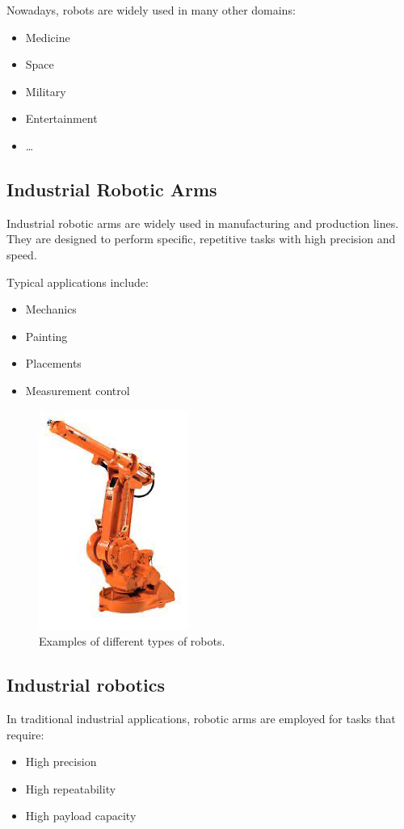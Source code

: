 Nowadays, robots are widely used in many other domains:
\begin{itemize}
  \item Medicine
  \item Space
  \item Military
  \item Entertainment
  \item \dots
\end{itemize}

\hfill

\subsection{Industrial Robotic Arms}

Industrial robotic arms are widely used in manufacturing and production lines. They are designed to perform specific, repetitive tasks with high precision and speed.

Typical applications include:
\begin{itemize}
  \item Mechanics
  \item Painting
  \item Placements
  \item Measurement control
\end{itemize}

\hfill
\begin{figure}[H]
  \centering
  \includegraphics[width=0.2\linewidth]{imgs/industrial_robot_arm.png}
  \caption{Examples of different types of robots.}
\end{figure}

\hfill

\subsection{Industrial robotics}

In traditional industrial applications, robotic arms are employed for tasks that require:
\begin{itemize}
  \item High precision
  \item High repeatability
  \item High payload capacity
\end{itemize}

